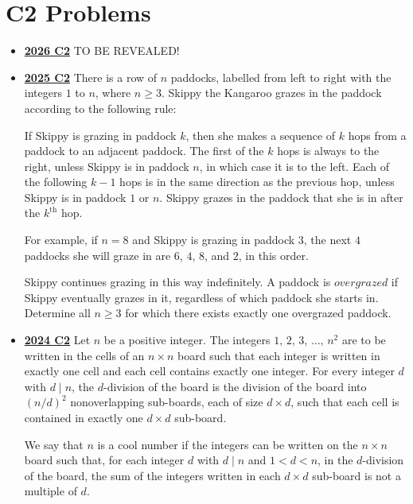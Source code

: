 \documentclass[11pt]{scrartcl}
\begin{document}
\section*{C2 Problems} \label{C2}
\begin{itemize}[leftmargin=*]


\item \href{https://www.imo-official.org/assets/documents/problems/2026/IMO2026SL.pdf}{\textbf{2026 C2}} TO BE REVEALED!

\item \href{https://artofproblemsolving.com/community/c6h3866876p38676996}{\textbf{2025 C2}}
There is a row of $n$ paddocks, labelled from left to right with the integers $1$ to $n$, where $n\geqslant 3$. Skippy the Kangaroo grazes in the paddock according to the following rule:

If Skippy is grazing in paddock $k$, then she makes a sequence of $k$ hops from a paddock to an adjacent paddock. The first of the $k$ hops is always to the right, unless Skippy is in paddock $n$, in which case it is to the left. Each of the following $k-1$ hops is in the same direction as the previous hop, unless Skippy is in paddock $1$ or $n$. Skippy grazes in the paddock that she is in after the $k^{\text{th}}$ hop.

For example, if $n=8$ and Skippy is grazing in paddock $3$, the next $4$ paddocks she will graze in are $6$, $4$, $8$, and $2$, in this order. 

Skippy continues grazing in this way indefinitely. A paddock is $overgrazed$ if Skippy eventually grazes in it, regardless of which paddock she starts in. Determine all $n\geqslant 3$ for which there exists exactly one overgrazed paddock.
\item \href{https://artofproblemsolving.com/community/c6h3610436p35340903}{\textbf{2024 C2}} Let $n$ be a positive integer. The integers $1,\,2,\,3,\,\dots,\,n^2$ are to be written in the cells of an $n\times n$ board such that each integer is written in exactly one cell and each cell contains exactly one integer. For every integer $d$ with $d\mid n$, the $d$-division of the board is the division of the board into $(n/d)^2$ nonoverlapping sub-boards, each of size $d\times d$, such that each cell is contained in exactly one $d\times d$ sub-board.

We say that $n$ is a cool number if the integers can be written on the $n\times n$ board such that, for each integer $d$ with $d\mid n$ and $1<d<n$, in the $d$-division of the board, the sum of the integers written in each $d\times d$ sub-board is not a multiple of $d$.


\end{itemize}
\end{document}
